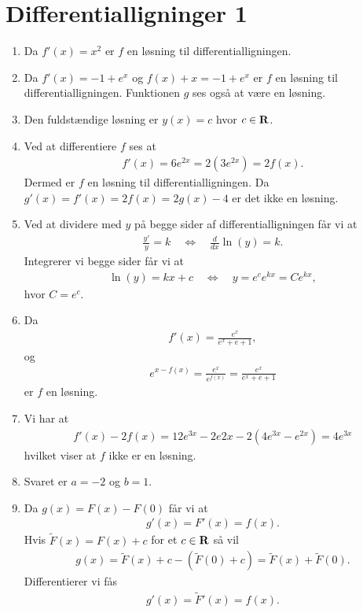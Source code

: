 \section{Differentialligninger 1}
\begin{enumerate}
	\item Da $ f'(x)=x^2 $ er $f$ en løsning til differentialligningen.
	
	\item Da $f'(x)=-1+e^x$ og $f(x)+x=-1+e^x$ er $f$ en løsning til differentialligningen. Funktionen $g$ ses også at være en løsning. 
	
	
	\item Den fuldstændige løsning er $y(x)=c$ hvor $c\in \mathbf{R}$.
	
	\item Ved at differentiere $f$ ses at 
	\begin{align*}
	f'(x)=6e^{2x}=2(3e^{2x})=2f(x).
	\end{align*}
	Dermed er $f$ en løsning til differentialligningen. Da $g'(x)=f'(x)=2f(x)=2g(x)-4$ er det ikke en løsning.
	
	
	
	\item \label{it:diffeq11ans} Ved at dividere med $y$ på begge sider af differentialligningen får vi at
	\begin{align*}
	\frac{y'}{y}=k\quad\Leftrightarrow\quad \frac{d}{dx} \ln(y)=k.
	\end{align*}
	Integrerer vi begge sider får vi at
	\begin{align*}
	\ln(y)=kx+c\quad\Leftrightarrow\quad y=e^ce^{kx}=Ce^{kx},
	\end{align*}
	hvor $C=e^c$.
	
	\item Da
	\begin{align*}
	f'(x)=\frac{e^x}{e^x+e+1},
	\end{align*}
	og
	\begin{align*}
	e^{x-f(x)}=\frac{e^x}{e^{f(x)}}=\frac{e^x}{e^x+e+1}
	\end{align*}
	er $f$ en løsning.
	
	\item Vi har at
	\begin{align*}
	f'(x)-2f(x)=12e^{3x}-2e{2x}-2(4e^{3x}-e^{2x})=4e^{3x}
	\end{align*}
	hvilket viser at $f$ ikke er en løsning.
	
	\item Svaret er $a=-2$ og $b=1$.

	
	\item Da $g(x)=F(x)-F(0)$ får vi at
	\begin{align*}
	g'(x)=F'(x)=f(x).
	\end{align*}
	Hvis $\tilde{F}(x)=F(x)+c$ for et $c\in \mathbf{R}$ så vil
	\begin{align*}
	g(x)=\tilde{F}(x)+c-(\tilde{F}(0)+c)=\tilde{F}(x)+\tilde{F}(0).
	\end{align*}
	Differentierer vi fås
	\begin{align*}
	g'(x)=\tilde{F}'(x)=f(x).
	\end{align*}
	

\end{enumerate}

